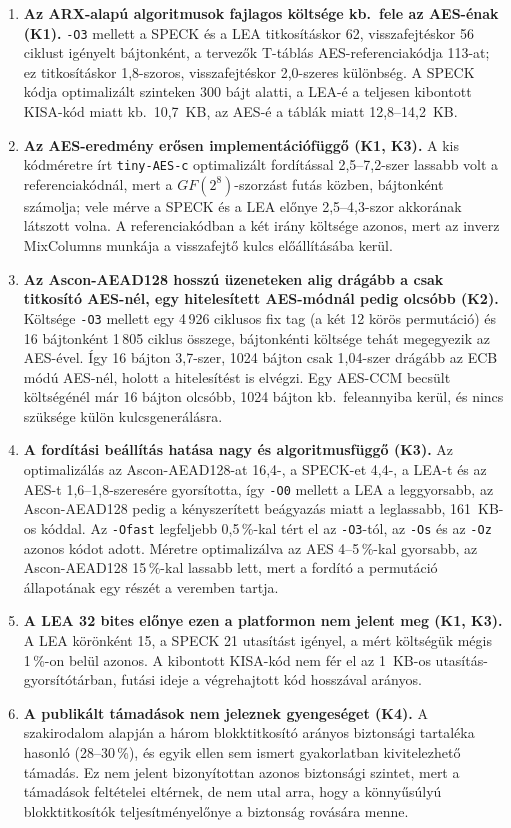 \documentclass[a4paper,12pt]{report}
\theoremstyle{definition}
\theoremstyle{remark}
\begin{document}
\begin{enumerate}
\item \textbf{Az ARX-alapú algoritmusok fajlagos költsége kb.\ fele az AES-énak (K1).} \texttt{-O3} mellett a SPECK és a LEA titkosításkor 62, visszafejtéskor 56 ciklust igényelt bájtonként, a tervezők T-táblás AES-referenciakódja 113-at; ez titkosításkor 1,8-szoros, visszafejtéskor 2,0-szeres különbség. A SPECK kódja optimalizált szinteken 300 bájt alatti, a LEA-é a teljesen kibontott KISA-kód miatt kb.\ 10,7~KB, az AES-é a táblák miatt 12,8--14,2~KB.

\item \textbf{Az AES-eredmény erősen implementációfüggő (K1, K3).} A kis kódméretre írt \texttt{tiny-AES-c} optimalizált fordítással 2,5--7,2-szer lassabb volt a referenciakódnál, mert a $GF(2^8)$-szorzást futás közben, bájtonként számolja; vele mérve a SPECK és a LEA előnye 2,5--4,3-szor akkorának látszott volna. A referenciakódban a két irány költsége azonos, mert az inverz MixColumns munkája a visszafejtő kulcs előállításába kerül.

\item \textbf{Az Ascon-AEAD128 hosszú üzeneteken alig drágább a csak titkosító AES-nél, egy hitelesített AES-módnál pedig olcsóbb (K2).} Költsége \texttt{-O3} mellett egy 4\,926 ciklusos fix tag (a két 12 körös permutáció) és 16 bájtonként 1\,805 ciklus összege, bájtonkénti költsége tehát megegyezik az AES-ével. Így 16 bájton 3,7-szer, 1024 bájton csak 1,04-szer drágább az ECB módú AES-nél, holott a hitelesítést is elvégzi. Egy AES-CCM becsült költségénél már 16 bájton olcsóbb, 1024 bájton kb.\ feleannyiba kerül, és nincs szüksége külön kulcsgenerálásra.

\item \textbf{A fordítási beállítás hatása nagy és algoritmusfüggő (K3).} Az optimalizálás az Ascon-AEAD128-at 16,4-, a SPECK-et 4,4-, a LEA-t és az AES-t 1,6--1,8-szeresére gyorsította, így \texttt{-O0} mellett a LEA a leggyorsabb, az Ascon-AEAD128 pedig a kényszerített beágyazás miatt a leglassabb, 161~KB-os kóddal. Az \texttt{-Ofast} legfeljebb 0,5\,\%-kal tért el az \texttt{-O3}-tól, az \texttt{-Os} és az \texttt{-Oz} azonos kódot adott. Méretre optimalizálva az AES 4--5\,\%-kal gyorsabb, az Ascon-AEAD128 15\,\%-kal lassabb lett, mert a fordító a permutáció állapotának egy részét a veremben tartja.

\item \textbf{A LEA 32 bites előnye ezen a platformon nem jelent meg (K1, K3).} A LEA körönként 15, a SPECK 21 utasítást igényel, a mért költségük mégis 1\,\%-on belül azonos. A kibontott KISA-kód nem fér el az 1~KB-os utasítás-gyorsítótárban, futási ideje a végrehajtott kód hosszával arányos.

\item \textbf{A publikált támadások nem jeleznek gyengeséget (K4).} A szakirodalom alapján a három blokktitkosító arányos biztonsági tartaléka hasonló (28--30\,\%), és egyik ellen sem ismert gyakorlatban kivitelezhető támadás. Ez nem jelent bizonyítottan azonos biztonsági szintet, mert a támadások feltételei eltérnek, de nem utal arra, hogy a könnyűsúlyú blokktitkosítók teljesítményelőnye a biztonság rovására menne.
\end{enumerate}
\end{document}

